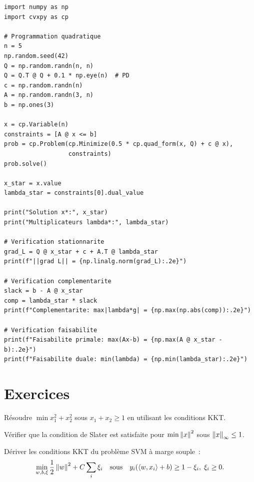 \begin{codeblock}[title=\textbf{V\'erification des conditions KKT avec CVXPY}]
\begin{verbatim}
import numpy as np
import cvxpy as cp

# Programmation quadratique
n = 5
np.random.seed(42)
Q = np.random.randn(n, n)
Q = Q.T @ Q + 0.1 * np.eye(n)  # PD
c = np.random.randn(n)
A = np.random.randn(3, n)
b = np.ones(3)

x = cp.Variable(n)
constraints = [A @ x <= b]
prob = cp.Problem(cp.Minimize(0.5 * cp.quad_form(x, Q) + c @ x),
                  constraints)
prob.solve()

x_star = x.value
lambda_star = constraints[0].dual_value

print("Solution x*:", x_star)
print("Multiplicateurs lambda*:", lambda_star)

# Verification stationnarite
grad_L = Q @ x_star + c + A.T @ lambda_star
print(f"||grad L|| = {np.linalg.norm(grad_L):.2e}")

# Verification complementarite
slack = b - A @ x_star
comp = lambda_star * slack
print(f"Complementarite: max|lambda*g| = {np.max(np.abs(comp)):.2e}")

# Verification faisabilite
print(f"Faisabilite primale: max(Ax-b) = {np.max(A @ x_star - b):.2e}")
print(f"Faisabilite duale: min(lambda) = {np.min(lambda_star):.2e}")
\end{verbatim}
\end{codeblock}

\section{Exercices}

\begin{exercice}[$\star$]
R\'esoudre $\min x_1^2 + x_2^2$ sous $x_1 + x_2 \geq 1$ en utilisant les conditions KKT.
\end{exercice}

\begin{exercice}[$\star$]
V\'erifier que la condition de Slater est satisfaite pour
$\min \left\| x \right\|^2$ sous $\left\| x \right\|_\infty \leq 1$.
\end{exercice}

\begin{exercice}[$\star\star$]
D\'eriver les conditions KKT du probl\`eme SVM \`a marge souple~:
\[
    \min_{w,b,\xi} \frac{1}{2}\left\| w \right\|^2 + C\sum_i \xi_i \quad \text{sous} \quad
    y_i(\langle w, x_i \rangle + b) \geq 1 - \xi_i, \; \xi_i \geq 0.
\]
\end{exercice}

